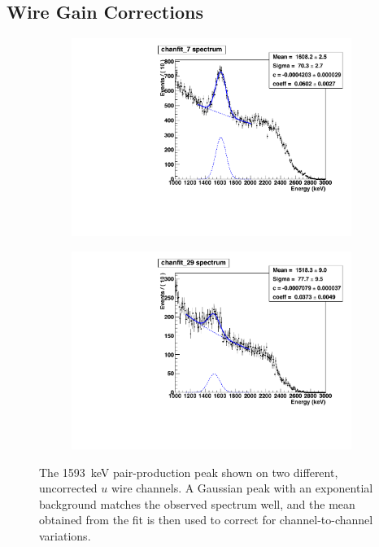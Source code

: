 \documentclass[herrin-thesis.tex]{subfiles}
\begin{document}
\subsection{Wire Gain Corrections}
\begin{figure}[htbp]
	\begin{subfigure}[t]{0.48\textwidth}
		\centering
		\includegraphics[width=\textwidth]{./plots/data_wiregain_pp07.pdf}
	\end{subfigure}\hfill%
	\begin{subfigure}[t]{0.48\textwidth}
		\centering
		\includegraphics[width=\textwidth]{./plots/data_wiregain_pp29.pdf}
	\end{subfigure}
	\caption[The pair-production peak on individual \(u\) wire channels]{The \SI{1593}{\keV} pair-production peak shown on two different, uncorrected \(u\) wire channels. A Gaussian peak with an exponential background matches the observed spectrum well, and the mean obtained from the fit is then used to correct for channel-to-channel variations.}
	\label{fig:data_wiregain_pp}
\end{figure}
\end{document}
